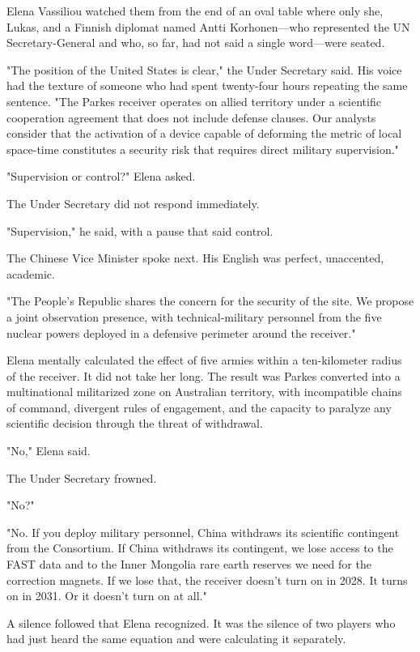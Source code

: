 \documentclass[11pt,a5paper,twoside]{book}
\begin{document}
Elena Vassiliou watched them from the end of an oval table where only she, Lukas, and a Finnish diplomat named Antti Korhonen—who represented the UN Secretary-General and who, so far, had not said a single word—were seated.

"The position of the United States is clear," the Under Secretary said. His voice had the texture of someone who had spent twenty-four hours repeating the same sentence. "The Parkes receiver operates on allied territory under a scientific cooperation agreement that does not include defense clauses. Our analysts consider that the activation of a device capable of deforming the metric of local space-time constitutes a security risk that requires direct military supervision."

"Supervision or control?" Elena asked.

The Under Secretary did not respond immediately.

"Supervision," he said, with a pause that said control.

The Chinese Vice Minister spoke next. His English was perfect, unaccented, academic.

"The People's Republic shares the concern for the security of the site. We propose a joint observation presence, with technical-military personnel from the five nuclear powers deployed in a defensive perimeter around the receiver."

Elena mentally calculated the effect of five armies within a ten-kilometer radius of the receiver. It did not take her long. The result was Parkes converted into a multinational militarized zone on Australian territory, with incompatible chains of command, divergent rules of engagement, and the capacity to paralyze any scientific decision through the threat of withdrawal.

"No," Elena said.

The Under Secretary frowned.

"No?"

"No. If you deploy military personnel, China withdraws its scientific contingent from the Consortium. If China withdraws its contingent, we lose access to the FAST data and to the Inner Mongolia rare earth reserves we need for the correction magnets. If we lose that, the receiver doesn't turn on in 2028. It turns on in 2031. Or it doesn't turn on at all."

A silence followed that Elena recognized. It was the silence of two players who had just heard the same equation and were calculating it separately.
\end{document}
